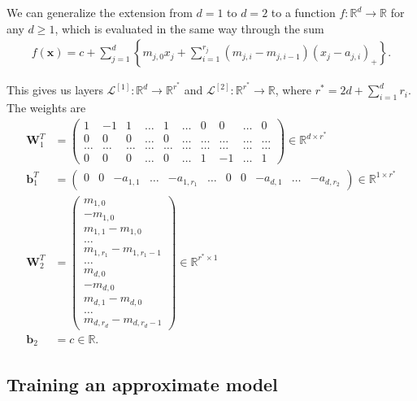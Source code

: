 \documentclass{somasmsc}
\begin{document}
We can generalize the extension from $d=1$ to $d=2$ to a function $f: \mathbb{R}^d \rightarrow \mathbb{R}$ for any $d \geq 1$, which is evaluated in the same way through the sum
\begin{align*}
f(\pmb{x}) = c + \sum_{j=1}^d \left\{m_{j,0} x_j + \sum_{i=1}^{r_j} \left(m_{j,i} - m_{j,i-1}\right) \left(x_j - a_{j,i}\right)_+\right\}.
\end{align*}

This gives us layers $\mathcal{L}^{\left[1\right]}: \mathbb{R}^d \rightarrow \mathbb{R}^{r^*}$ and $\mathcal{L}^{\left[2\right]}: \mathbb{R}^{r^*} \rightarrow \mathbb{R}$, where $r^* = 2d + \sum_{i=1}^d r_i$. The weights are
\setcounter{MaxMatrixCols}{11}
\begin{align*}
\mathbf{W}_1^T &=
\begin{pmatrix}
    1 & -1 & 1 & \dots & 1 & \dots & 0 & 0 & \dots & 0 \\
    0 & 0 & 0 & \dots & 0 & \dots & \dots & \dots & \dots & \dots \\
    \dots & \dots & \dots & \dots & \dots & \dots & \dots & \dots & \dots & \dots \\
    0 & 0 & 0 & \dots & 0 & \dots & 1 & -1 & \dots & 1
\end{pmatrix} \in \mathbb{R}^{d \times r^*} \\
\pmb{b}_1^T &= 
\begin{pmatrix}
    0 & 0 & -a_{1,1} & \dots & -a_{1,r_1} & \dots & 0 & 0 & -a_{d,1} & \dots & -a_{d,r_2}
\end{pmatrix} \in \mathbb{R}^{1 \times r^*} \\
\mathbf{W}_2^T &=
\begin{pmatrix}
    m_{1,0} \\
    -m_{1,0} \\
    m_{1,1} - m_{1,0} \\
    \dots \\
    m_{1,r_1} - m_{1,r_1 - 1} \\
    \dots \\
    m_{d,0} \\
    -m_{d,0}\\
    m_{d,1} - m_{d,0} \\
    \dots \\
    m_{d,r_d} - m_{d,r_d - 1}
\end{pmatrix} \in \mathbb{R}^{r^* \times 1} \\
\pmb{b}_2 &= c \in \mathbb{R}.
\end{align*}


\subsection{Training an approximate model}\label{piece:train}
\end{document}
